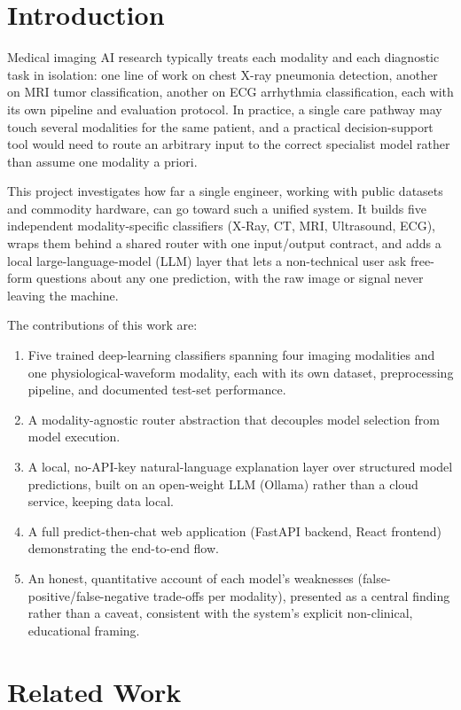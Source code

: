 \documentclass[conference]{IEEEtran}
\begin{document}
\section{Introduction}
Medical imaging AI research typically treats each modality and each diagnostic task in isolation: one line of work on chest X-ray pneumonia detection, another on MRI tumor classification, another on ECG arrhythmia classification, each with its own pipeline and evaluation protocol. In practice, a single care pathway may touch several modalities for the same patient, and a practical decision-support tool would need to route an arbitrary input to the correct specialist model rather than assume one modality a priori.

This project investigates how far a single engineer, working with public datasets and commodity hardware, can go toward such a unified system. It builds five independent modality-specific classifiers (X-Ray, CT, MRI, Ultrasound, ECG), wraps them behind a shared router with one input/output contract, and adds a local large-language-model (LLM) layer that lets a non-technical user ask free-form questions about any one prediction, with the raw image or signal never leaving the machine.

The contributions of this work are:
\begin{enumerate}
\item Five trained deep-learning classifiers spanning four imaging modalities and one physiological-waveform modality, each with its own dataset, preprocessing pipeline, and documented test-set performance.
\item A modality-agnostic router abstraction that decouples model selection from model execution.
\item A local, no-API-key natural-language explanation layer over structured model predictions, built on an open-weight LLM (Ollama) rather than a cloud service, keeping data local.
\item A full predict-then-chat web application (FastAPI backend, React frontend) demonstrating the end-to-end flow.
\item An honest, quantitative account of each model's weaknesses (false-positive/false-negative trade-offs per modality), presented as a central finding rather than a caveat, consistent with the system's explicit non-clinical, educational framing.
\end{enumerate}

\section{Related Work}
\end{document}
